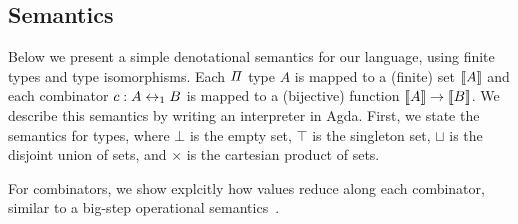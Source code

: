 


\subsection{Semantics}
\label{subsec:denotational}

\noindent Below we present a simple denotational semantics for our language, using finite types and type isomorphisms.
Each $\mathit{\Pi}$ type $A$ is mapped to a (finite) set $\llbracket A\rrbracket$ and each combinator $c : A \leftrightarrow_1 B$ is mapped to a
(bijective) function $\llbracket A\rrbracket \to \llbracket B\rrbracket$. We describe this semantics by writing an interpreter in Agda. First, we
state the semantics for types, where $\bot$ is the empty set, $\top$ is the singleton set, $\sqcup$ is the disjoint
union of sets, and $\times$ is the cartesian product of sets.


\begin{center}
  {}
\end{center}

For combinators, we show explcitly how values reduce along each combinator, similar to a big-step operational
semantics~\cite{chenComputationalInterpretationCompact2021,theseus}.


